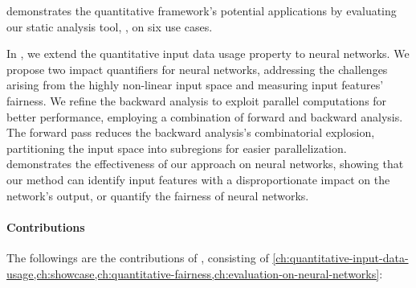  demonstrates the quantitative framework's potential applications by evaluating our static analysis tool, \impatto,\sidenote{\label{intro:impatto}\impattourl} on six use cases.


In , we extend the quantitative input data usage property to neural networks.
We propose two impact quantifiers for neural networks, addressing the challenges arising from the highly non-linear input space and measuring input features' fairness.
We refine the backward analysis to exploit parallel computations for better performance, employing a combination of forward and backward analysis.
The forward pass reduces the backward analysis's combinatorial explosion, partitioning the input space into subregions for easier parallelization.
 demonstrates the effectiveness of our approach on neural networks, showing that our method can identify input features with a disproportionate impact on the network's output, or quantify the fairness of neural networks.



\paragraph{Contributions}
The followings are the contributions of , consisting of \cref{ch:quantitative-input-data-usage,ch:showcase,ch:quantitative-fairness,ch:evaluation-on-neural-networks}:

